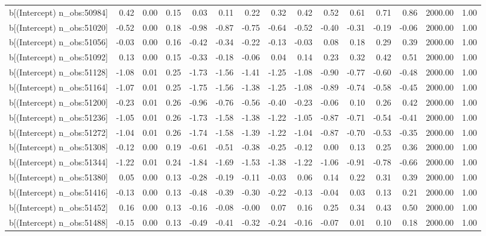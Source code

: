 \begin{table}[ht]
\begin{tabular}{rrrrrrrrrrrrrrr}
  b[(Intercept) n\_obs:50984] & 0.42 & 0.00 & 0.15 & 0.03 & 0.11 & 0.22 & 0.32 & 0.42 & 0.52 & 0.61 & 0.71 & 0.86 & 2000.00 & 1.00 \\ 
  b[(Intercept) n\_obs:51020] & -0.52 & 0.00 & 0.18 & -0.98 & -0.87 & -0.75 & -0.64 & -0.52 & -0.40 & -0.31 & -0.19 & -0.06 & 2000.00 & 1.00 \\ 
  b[(Intercept) n\_obs:51056] & -0.03 & 0.00 & 0.16 & -0.42 & -0.34 & -0.22 & -0.13 & -0.03 & 0.08 & 0.18 & 0.29 & 0.39 & 2000.00 & 1.00 \\ 
  b[(Intercept) n\_obs:51092] & 0.13 & 0.00 & 0.15 & -0.33 & -0.18 & -0.06 & 0.04 & 0.14 & 0.23 & 0.32 & 0.42 & 0.51 & 2000.00 & 1.00 \\ 
  b[(Intercept) n\_obs:51128] & -1.08 & 0.01 & 0.25 & -1.73 & -1.56 & -1.41 & -1.25 & -1.08 & -0.90 & -0.77 & -0.60 & -0.48 & 2000.00 & 1.00 \\ 
  b[(Intercept) n\_obs:51164] & -1.07 & 0.01 & 0.25 & -1.75 & -1.56 & -1.38 & -1.25 & -1.08 & -0.89 & -0.74 & -0.58 & -0.45 & 2000.00 & 1.00 \\ 
  b[(Intercept) n\_obs:51200] & -0.23 & 0.01 & 0.26 & -0.96 & -0.76 & -0.56 & -0.40 & -0.23 & -0.06 & 0.10 & 0.26 & 0.42 & 2000.00 & 1.00 \\ 
  b[(Intercept) n\_obs:51236] & -1.05 & 0.01 & 0.26 & -1.73 & -1.58 & -1.38 & -1.22 & -1.05 & -0.87 & -0.71 & -0.54 & -0.41 & 2000.00 & 1.00 \\ 
  b[(Intercept) n\_obs:51272] & -1.04 & 0.01 & 0.26 & -1.74 & -1.58 & -1.39 & -1.22 & -1.04 & -0.87 & -0.70 & -0.53 & -0.35 & 2000.00 & 1.00 \\ 
  b[(Intercept) n\_obs:51308] & -0.12 & 0.00 & 0.19 & -0.61 & -0.51 & -0.38 & -0.25 & -0.12 & 0.00 & 0.13 & 0.25 & 0.36 & 2000.00 & 1.00 \\ 
  b[(Intercept) n\_obs:51344] & -1.22 & 0.01 & 0.24 & -1.84 & -1.69 & -1.53 & -1.38 & -1.22 & -1.06 & -0.91 & -0.78 & -0.66 & 2000.00 & 1.00 \\ 
  b[(Intercept) n\_obs:51380] & 0.05 & 0.00 & 0.13 & -0.28 & -0.19 & -0.11 & -0.03 & 0.06 & 0.14 & 0.22 & 0.31 & 0.39 & 2000.00 & 1.00 \\ 
  b[(Intercept) n\_obs:51416] & -0.13 & 0.00 & 0.13 & -0.48 & -0.39 & -0.30 & -0.22 & -0.13 & -0.04 & 0.03 & 0.13 & 0.21 & 2000.00 & 1.00 \\ 
  b[(Intercept) n\_obs:51452] & 0.16 & 0.00 & 0.13 & -0.16 & -0.08 & -0.00 & 0.07 & 0.16 & 0.25 & 0.34 & 0.43 & 0.50 & 2000.00 & 1.00 \\ 
  b[(Intercept) n\_obs:51488] & -0.15 & 0.00 & 0.13 & -0.49 & -0.41 & -0.32 & -0.24 & -0.16 & -0.07 & 0.01 & 0.10 & 0.18 & 2000.00 & 1.00 \\ 

\end{tabular}
\end{table}
